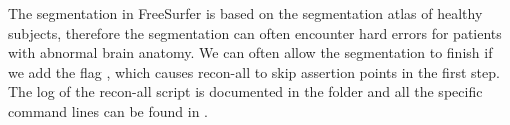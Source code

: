 The segmentation in FreeSurfer is based on the segmentation atlas of
healthy subjects, therefore the segmentation can often encounter hard
errors for patients with abnormal brain anatomy. We can often allow
the segmentation to finish if we add the flag ,
which causes recon-all to skip assertion points in the first step. The
log of the recon-all script is documented in the folder 
and all the specific command lines can be found in .



